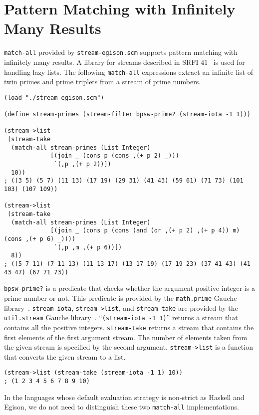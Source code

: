 \documentclass[acmlarge]{acmart}
\newcommand{\new}[1]{\textcolor{blue}{#1}}
\begin{document}
\section{Pattern Matching with Infinitely Many Results}\label{pm-inf}

\lstinline{match-all} provided by \texttt{stream-egison.scm} supports pattern matching with infinitely many results.
A library for streams described in SRFI 41~\cite{bewig2007scheme} is used for handling lazy lists.
The following \lstinline{match-all} expressions extract an infinite list of twin primes and prime triplets from a stream of prime numbers.

\begin{lstlisting}[language=egison]
(load "./stream-egison.scm")

(define stream-primes (stream-filter bpsw-prime? (stream-iota -1 1)))

(stream->list
 (stream-take
  (match-all stream-primes (List Integer)
             [(join _ (cons p (cons ,(+ p 2) _)))
              `(,p ,(+ p 2))])
  10))
; ((3 5) (5 7) (11 13) (17 19) (29 31) (41 43) (59 61) (71 73) (101 103) (107 109))

(stream->list
 (stream-take
  (match-all stream-primes (List Integer)
             [(join _ (cons p (cons (and (or ,(+ p 2) ,(+ p 4)) m) (cons ,(+ p 6) _))))
              `(,p ,m ,(+ p 6))])
  8))
; ((5 7 11) (7 11 13) (11 13 17) (13 17 19) (17 19 23) (37 41 43) (41 43 47) (67 71 73))
\end{lstlisting}

\noindent
\lstinline{bpsw-prime?} is a predicate that checks whether the argument positive integer is a prime number or not.
This predicate is provided by the \texttt{math.prime} Gauche library~\cite{gauchePN}.
\lstinline{stream-iota}, \lstinline{stream->list}, and \lstinline{stream-take} are provided by the \texttt{util.stream} Gauche library~\cite{gaucheST}.
``\lstinline{(stream-iota -1 1)}'' returns a stream that contains all the positive integers.
\lstinline{stream-take} returns a stream that contains the first elements of the first argument stream.
The number of elements taken from the given stream is specified by the second argument.
\lstinline{stream->list} is a function that converts the given stream to a list.

\begin{lstlisting}[language=egison]
(stream->list (stream-take (stream-iota -1 1) 10))
; (1 2 3 4 5 6 7 8 9 10)
\end{lstlisting}



In the languages whose default evaluation strategy is non-strict as Haskell and Egison, we do not need to distinguish these two \lstinline{match-all} implementations.
\end{document}
